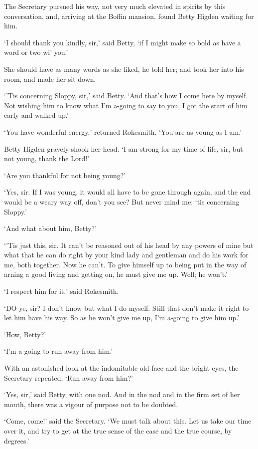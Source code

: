 The Secretary pursued his way, not very much elevated in spirits by this
conversation, and, arriving at the Boffin mansion, found Betty Higden
waiting for him.

‘I should thank you kindly, sir,’ said Betty, ‘if I might make so bold
as have a word or two wi’ you.’

She should have as many words as she liked, he told her; and took her
into his room, and made her sit down.

‘’Tis concerning Sloppy, sir,’ said Betty. ‘And that’s how I come here
by myself. Not wishing him to know what I’m a-going to say to you, I got
the start of him early and walked up.’

‘You have wonderful energy,’ returned Rokesmith. ‘You are as young as I
am.’

Betty Higden gravely shook her head. ‘I am strong for my time of life,
sir, but not young, thank the Lord!’

‘Are you thankful for not being young?’

‘Yes, sir. If I was young, it would all have to be gone through again,
and the end would be a weary way off, don’t you see? But never mind me;
‘tis concerning Sloppy.’

‘And what about him, Betty?’

‘’Tis just this, sir. It can’t be reasoned out of his head by any powers
of mine but what that he can do right by your kind lady and gentleman
and do his work for me, both together. Now he can’t. To give himself up
to being put in the way of arning a good living and getting on, he must
give me up. Well; he won’t.’

‘I respect him for it,’ said Rokesmith.

‘DO ye, sir? I don’t know but what I do myself. Still that don’t make it
right to let him have his way. So as he won’t give me up, I’m a-going to
give him up.’

‘How, Betty?’

‘I’m a-going to run away from him.’

With an astonished look at the indomitable old face and the bright eyes,
the Secretary repeated, ‘Run away from him?’

‘Yes, sir,’ said Betty, with one nod. And in the nod and in the firm set
of her mouth, there was a vigour of purpose not to be doubted.

‘Come, come!’ said the Secretary. ‘We must talk about this. Let us take
our time over it, and try to get at the true sense of the case and the
true course, by degrees.’

